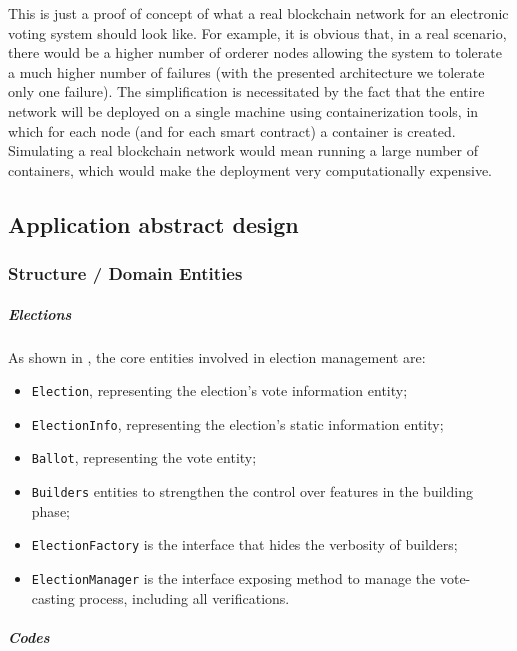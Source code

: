 \documentclass{scrartcl}
\begin{document}
\begin{warn}
    This is just a proof of concept of what a real blockchain network for an electronic voting system should look like. For example, it is obvious that, in a real scenario, there would be a higher number of orderer nodes allowing the system to tolerate a much higher number of failures (with the presented architecture we tolerate only one failure). 
    The simplification is necessitated by the fact that the entire network will be deployed on a single machine using containerization tools, in which for each node (and for each smart contract) a container is created.
    Simulating a real blockchain network would mean running a large number of containers, which would make the deployment very computationally expensive.
\end{warn}

\subsection{Application abstract design}

\subsubsection{Structure / Domain Entities}

\subparagraph*{Elections}

As shown in , the core entities involved in election management are:
\begin{itemize}
    \item \texttt{Election}, representing the election's vote information entity;
    \item \texttt{ElectionInfo}, representing the election's static information entity;
    \item \texttt{Ballot}, representing the vote entity;
    \item \texttt{Builders} entities to strengthen the control over features in the building phase;
    \item \texttt{ElectionFactory} is the interface that hides the verbosity of builders;
    \item \texttt{ElectionManager} is the interface exposing method to manage the vote-casting process, including all verifications.
\end{itemize}

\subparagraph*{Codes}
\end{document}

